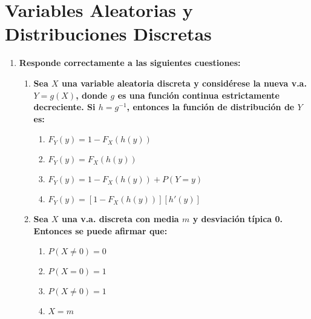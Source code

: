 \documentclass[fleqn]{article}
\begin{document}
        \newpage

        \section{Variables Aleatorias y Distribuciones Discretas}

        \begin{enumerate}

                \subsection{Opción Múltiple}
                \item \textbf{Responde correctamente a las siguientes cuestiones:}
                
                        \begin{enumerate}
                                \item \textbf{Sea $X$ una variable aleatoria discreta y considérese la nueva v.a. $Y = g(X)$, 
                                        donde $g$ es una función continua estrictamente decreciente. Si $h = g^{-1}$, entonces 
                                        la función de distribución de $Y$ es:} 
                                        \begin{enumerate}
                                                \item $F_Y (y) = 1 - F_X (h(y))$
                                                \item $F_Y (y) = F_X (h(y))$
                                                \item $F_Y (y) = 1 - F_X (h(y)) + P(Y=y)$
                                                \item $F_Y (y) = [1 - F_X (h(y))][h'(y)]$
                                        \end{enumerate}
                                
                                \item \textbf{Sea $X$ una v.a. discreta con media $m$ y desviación típica 0. Entonces se puede afirmar que:}
                                        \begin{enumerate}
                                                \item $P(X \neq 0) = 0$
                                                \item $P(X = 0) = 1$
                                                \item $P(X \neq 0) = 1$
                                                \item $X=m$
                                        \end{enumerate}


\end{enumerate}
\end{enumerate}
\end{document}
